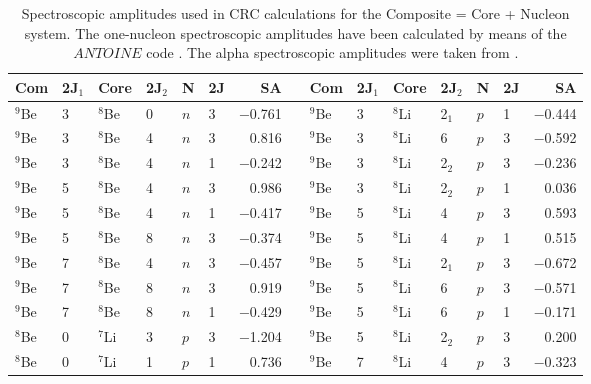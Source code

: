 \documentclass[
12pt, %
oneside, %
english, %
onehalfspacing, %
onehalfspacing, %
headsepline, %
]{MastersDoctoralThesis} %
\begin{document}
\begin{table*}[tp]
\footnotesize
\caption{\label{dbe_SA} \footnotesize Spectroscopic amplitudes used in CRC calculations for the Composite = Core + Nucleon system. The one-nucleon spectroscopic amplitudes have been calculated by means of the $ANTOINE$ code \cite{antoine}. The alpha spectroscopic amplitudes were taken from  \cite{volya, volya2017}. }
\begin{tabular*}{\textwidth}{@{\extracolsep{\fill}}llllllrl@{\extracolsep{\fill}}llllllr@{\extracolsep{\fill}}}
\toprule
Com & 2J$_{1}$ & Core & 2J$_{2}$ & N & 2J & SA &    & Com & 2J$_{1}$ & Core & 2J$_{2}$ & N & 2J & SA      \\
\midrule 
$^9$Be  & 3  & ${}^8$Be   & 0   & $n$       & 3   & $-$0.761 &  & ${}^9$Be  & 3  & ${}^8$Li   & 2$_1$    & $p$       & 1   & $-$0.444  \\
$^9$Be  & 3  & ${}^8$Be   & 4   & $n$       & 3   & 0.816  &  & ${}^9$Be  & 3  & ${}^8$Li    & 6   & $p$       & 3   & $-$0.592  \\
$^9$Be  & 3  & ${}^8$Be   & 4   & $n$       & 1   & $-$0.242 &  & ${}^9$Be  & 3  & ${}^8$Li    & 2$_2$   & $p$       & 3   & $-$0.236  \\
$^9$Be  & 5  & ${}^8$Be   & 4   & $n$       & 3   & 0.986  &  & ${}^9$Be  & 3  & ${}^8$Li    & 2$_2$   & $p$       & 1   & 0.036   \\
$^9$Be  & 5  & ${}^8$Be   & 4   & $n$       & 1   & $-$0.417 &  & ${}^9$Be  & 5  & ${}^8$Li    & 4   & $p$       & 3   & 0.593   \\
$^9$Be  & 5  & ${}^8$Be   & 8   & $n$       & 3   & $-$0.374 &  & ${}^9$Be  & 5  & ${}^8$Li    & 4   & $p$       & 1   & 0.515   \\
$^9$Be  & 7  & ${}^8$Be   & 4   & $n$       & 3   & $-$0.457 &  & ${}^9$Be  & 5  & ${}^8$Li   & 2$_1$    & $p$       & 3   & $-$0.672  \\
$^9$Be  & 7  & ${}^8$Be   & 8   & $n$       & 3   & 0.919  &  & ${}^9$Be  & 5  & ${}^8$Li    & 6   & $p$       & 3   & $-$0.571  \\
$^9$Be  & 7  & ${}^8$Be   & 8   & $n$       & 1   & $-$0.429 &  & ${}^9$Be  & 5  & ${}^8$Li    & 6   & $p$       & 1   & $-$0.171  \\
$^8$Be  & 0  & ${}^7$Li   & 3   & $p$       & 3   & $-$1.204 &  & ${}^9$Be  & 5  & ${}^8$Li    & 2$_2$   & $p$       & 3   & 0.200     \\
$^8$Be  & 0  & ${}^7$Li   & 1   & $p$       & 1   & 0.736  &  & ${}^9$Be  & 7  & ${}^8$Li    & 4   & $p$       & 3   & $-$0.323  \\

\end{tabular*}
\end{table*}
\end{document}

